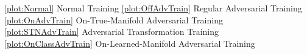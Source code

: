 \documentclass[varwidth=20cm]{standalone}
\begin{document}
    
    
    \ref{plot:Normal} Normal Training\hspace*{0.5cm}
    \ref{plot:OffAdvTrain} Regular Adversarial Training\\
    \ref{plot:OnAdvTrain} On-True-Manifold Adversarial Training\\
    \ref{plot:STNAdvTrain} Adversarial Transformation Training\\
    \ref{plot:OnClassAdvTrain} On-Learned-Manifold Adversarial Training
\end{document}
